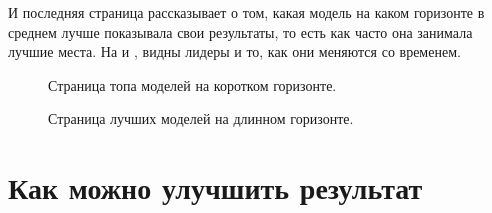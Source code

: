 \documentclass[12pt, a4paper]{article}
\begin{document}
И последняя страница рассказывает о том, какая модель на каком горизонте в среднем лучше показывала свои результаты, то есть как часто она занимала лучшие места. На  и , видны лидеры и то, как они меняются со временем.
\begin{figure}[H]
\caption{Страница топа моделей на коротком горизонте.}
\label{fig:top}
\end{figure}
\begin{figure}[!h]
\caption{Страница лучших моделей на длинном горизонте.}
\label{fig:top_other}
\end{figure}

\section{Как можно улучшить результат}
\end{document}

